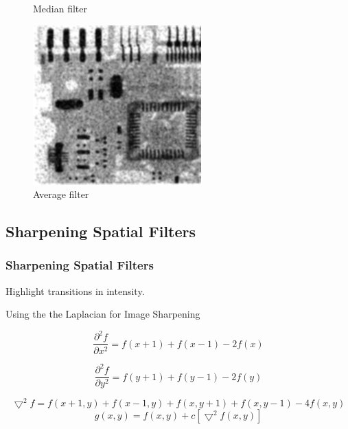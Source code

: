 \documentclass[notheorems, serif, table, compress]{beamer}  %
\begin{document}
\begin{frame}
\begin{figure}
\begin{minipage}[t]{0.3\linewidth}
\caption{Median filter}
\end{minipage}
            \begin{minipage}[t]{0.3\linewidth}
            \centering
            
            \includegraphics[width=1\linewidth]{aveout.jpg} 
            \caption{Average filter}
\end{minipage}
        \end{figure}
 \end{frame}

\subsection{Sharpening Spatial Filters}
\begin{frame}
\frametitle{Sharpening Spatial Filters}%
 Highlight transitions in intensity.


Using the the Laplacian for Image Sharpening 

\begin{equation} \label{3.30}
 \frac{\partial^{2}f}{\partial x^{2}}=f(x+1)+f(x-1)-2f(x)
\end{equation}

\begin{equation} \label{3.31}
 \frac{\partial^{2}f}{\partial y^{2}}=f(y+1)+f(y-1)-2f(y)
\end{equation}

\begin{equation} \label{3.32}
\bigtriangledown^{2}f= f(x+1, y)+f(x-1, y)+f(x, y+1)+f(x, y-1)-4f(x, y)
\end{equation}
\begin{equation} \label{3.33}
g(x, y)=f(x, y)+c[\bigtriangledown^{2}f(x, y)]
\end{equation}
 \end{frame}
\end{document}
